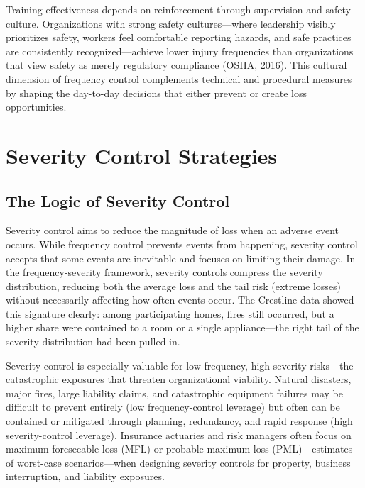 \documentclass[11pt,openany]{book}
\begin{document}
Training effectiveness depends on reinforcement through supervision and safety
culture. Organizations with strong safety cultures---where leadership visibly
prioritizes safety, workers feel comfortable reporting hazards, and safe
practices are consistently recognized---achieve lower injury frequencies than
organizations that view safety as merely regulatory compliance (OSHA, 2016).
This cultural dimension of frequency control complements technical and
procedural measures by shaping the day-to-day decisions that either prevent or
create loss opportunities.

\section{Severity Control Strategies}
\label{sec:severity-control}

\subsection{The Logic of Severity Control}

Severity control aims to reduce the magnitude of loss when an adverse event
occurs. While frequency control prevents events from happening, severity
control accepts that some events are inevitable and focuses on limiting their
damage. In the frequency-severity framework, severity controls compress the
severity distribution, reducing both the average loss and the tail risk
(extreme losses) without necessarily affecting how often events occur. The
Crestline data showed this signature clearly: among participating homes, fires
still occurred, but a higher share were contained to a room or a single
appliance---the right tail of the severity distribution had been pulled in.

Severity control is especially valuable for low-frequency, high-severity
risks---the catastrophic exposures that threaten organizational viability.
Natural disasters, major fires, large liability claims, and catastrophic
equipment failures may be difficult to prevent entirely (low frequency-control
leverage) but often can be contained or mitigated through planning,
redundancy, and rapid response (high severity-control leverage). Insurance
actuaries and risk managers often focus on maximum foreseeable loss (MFL) or
probable maximum loss (PML)---estimates of worst-case scenarios---when
designing severity controls for property, business interruption, and liability
exposures.
\end{document}
